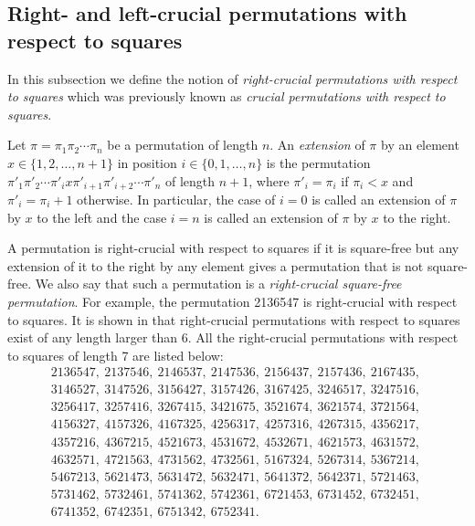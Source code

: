 \documentclass[12pt,reqno]{article}
\begin{document}
\subsection{Right- and left-crucial permutations with respect to squares}\label{sub-right-crucial-perm}

In this subsection we define the notion of {\em right-crucial permutations with respect to squares} which was previously known \cite{AKPV}  as {\em crucial permutations with respect to squares}.  

Let $\pi=\pi_1\pi_2\cdots\pi_n$ be a permutation of length $n$. An {\em extension} of $\pi$ by an element $x\in\{1,2,\ldots,n+1\}$ in position $i\in\{0,1,\ldots,n\}$ is the permutation $\pi'_1\pi'_2\cdots\pi'_{i}x\pi'_{i+1}\pi'_{i+2}\cdots\pi'_n$ of length $n+1$, where $\pi'_i=\pi_i$ if $\pi_i<x$ and $\pi'_i=\pi_i+1$ otherwise. In particular, the case of $i=0$ is called an extension of $\pi$ by $x$ to the left and the case $i=n$ is called an extension of $\pi$ by $x$ to the right. 

A permutation is right-crucial with respect to squares if it is square-free but any extension of it to the right by any element gives a permutation that is not square-free. We also say that such a permutation is a {\em right-crucial square-free permutation}. For example, the permutation 2136547 is right-crucial with respect to squares. It is shown in \cite{AKPV} that right-crucial permutations with respect to squares exist of any length larger than 6. All the right-crucial
permutations with respect to squares of length 7 are listed below: 
$$\begin{array}{l}2136547,\ 2137546,\ 2146537,\ 2147536,\ 2156437,\ 2157436,\
2167435,\ \\
 3146527,\ 3147526,\ 3156427,\ 3157426,\ 3167425,\ 3246517,\
 3247516,\ \\
 3256417,\ 3257416,\ 3267415,\ 3421675,\ 3521674,\ 3621574,\
 3721564,\ \\
 4156327,\ 4157326,\ 4167325,\ 4256317,\ 4257316,\ 4267315,\
 4356217,\ \\
 4357216,\ 4367215,\ 4521673,\ 4531672,\ 4532671,\ 4621573,\
 4631572,\ \\
 4632571,\ 4721563,\ 4731562,\ 4732561,\ 5167324,\ 5267314,\
 5367214,\ \\
 5467213,\ 5621473,\ 5631472,\ 5632471,\ 5641372,\ 5642371,\
 5721463,\ \\
 5731462,\ 5732461,\ 5741362,\ 5742361,\ 6721453,\ 6731452,\
 6732451,\ \\
 6741352,\ 6742351,\ 6751342,\ 6752341.\end{array}$$
\end{document}
